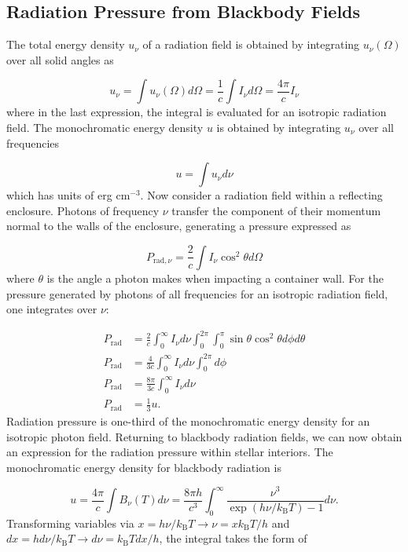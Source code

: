 \documentclass[12pt]{article}
\newcommand{\bigparenthesis}[1]{\left(#1\right)}
\begin{document}
\subsection{Radiation Pressure from Blackbody Fields}
The total energy density $u_\nu$ of a radiation field is obtained by integrating $u_\nu(\Omega)$ over all solid angles as 

\begin{equation}
    u_\nu = \int u_\nu(\Omega) d\Omega = \frac{1}{c}\int I_\nu d\Omega = \frac{4\pi}{c} I_\nu
\end{equation}
%
where in the last expression, the integral is evaluated for an isotropic radiation field. The monochromatic energy density $u$ is obtained by integrating $u_\nu$ over all frequencies

\begin{equation}
    u = \int u_\nu d\nu
\end{equation}
%
which has units of erg cm$^{-3}$. Now consider a radiation field within a reflecting enclosure. Photons of frequency $\nu$ transfer the component of their momentum normal to the walls of the enclosure, generating a pressure expressed as

\begin{equation}
    P_{\mathrm{rad},\nu} = \frac{2}{c} \int I_\nu \cos^2\theta d\Omega
\end{equation}
%
where $\theta$ is the angle a photon makes when impacting a container wall. For the pressure generated by photons of all frequencies for an isotropic radiation field, one integrates over $\nu$:

\begin{align}
    P_{\mathrm{rad}} &= \frac{2}{c} \int_0^\infty I_\nu d\nu \int_0^{2\pi} \int_{0}^{\pi} \sin\theta \cos^2 \theta d\phi d\theta \\
    P_{\mathrm{rad}} &= \frac{4}{3c} \int_0^\infty I_\nu d\nu \int_0^{2\pi} d\phi \\
    P_{\mathrm{rad}} &= \frac{8\pi}{3c} \int_0^\infty I_\nu d\nu  \\
    P_{\mathrm{rad}} &= \frac{1}{3} u.
\end{align}
%
Radiation pressure is one-third of the monochromatic energy density for an isotropic photon field. Returning to blackbody radiation fields, we can now obtain an expression for the radiation pressure within stellar interiors. The monochromatic energy density for blackbody radiation is

\begin{equation}
    u = \frac{4\pi}{c} \int B_\nu(T) d\nu = \frac{8\pi h}{c^3} \int_0^{\infty} \frac{\nu^3}{\exp\bigparenthesis{h\nu/k_\mathrm{B}T}-1} d\nu.
\end{equation}
%
Transforming variables via $x = h\nu/k_\mathrm{B}T \rightarrow \nu = x k_\mathrm{B}T / h $ and $dx = hd\nu/k_\mathrm{B}T \rightarrow d\nu = k_\mathrm{B}T dx/h$, the integral takes the form of
\end{document}
